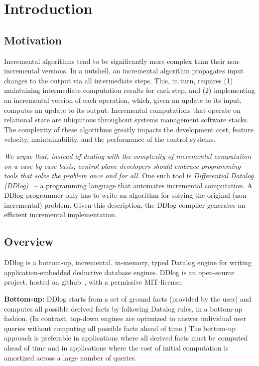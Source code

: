 \section{Introduction}\label{sec-introduction}

\subsection{Motivation}

Incremental algorithms tend to be significantly more complex than
their non-incremental versions.  In a nutshell, an incremental
algorithm propagates input changes to the output via all intermediate
steps.  This, in turn, requires (1) maintaining intermediate
computation results for each step, and (2) implementing an incremental
version of each operation, which, given an update to its input,
computes an update to its output.  Incremental computations that
operate on relational state are ubiquitous throughout systems
management software stacks.  The complexity of these algorithms
greatly impacts the development cost, feature velocity,
maintainability, and the performance of the control systems.

\emph{We argue that, instead of dealing with the complexity of
  incremental computation on a case-by-case basis, control plane
  developers should embrace programming tools that solve the problem
  once and for all.}  One such tool is \emph{Differential Datalog
  (DDlog)}~\cite{ddlog} -- a programming language that automates
incremental computation.  A DDlog programmer only has to write an
algorithm for solving the original (non-incremental) problem.  Given
this description, the DDlog compiler generates an efficient
incremental implementation.  

\subsection{Overview}

DDlog is a bottom-up, incremental, in-memory, typed Datalog engine for
writing application-embedded deductive database engines.  DDlog is an
open-source project, hosted on github~\cite{ddlog}, with a permissive
MIT-license.

\textbf{Bottom-up:} DDlog starts from a set of ground facts (provided
by the user) and computes all possible derived facts by following
Datalog rules, in a bottom-up fashion.  (In contrast, top-down engines
are optimized to answer individual user queries without computing all
possible facts ahead of time.)  The bottom-up approach is preferable
in applications where all derived facts must be computed ahead of time
and in applications where the cost of initial computation is amortized
across a large number of queries.

